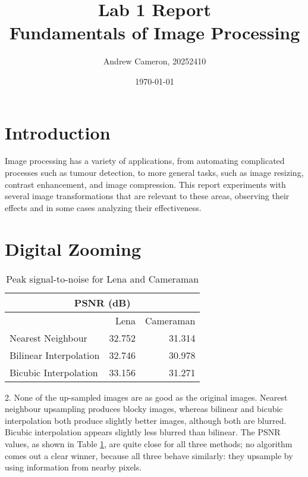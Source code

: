 \documentclass{sydeStyle}
\title{Lab 1 Report\\
Fundamentals of Image Processing}
\date{\today}
\author{Andrew Cameron, 20252410}
\begin{document}
\maketitle

\section*{Introduction}
Image processing has a variety of applications, from automating complicated
processes such as tumour detection, to more general tasks, such as image
resizing, contrast enhancement, and image compression.
This report experiments with several image transformations that are relevant to
these areas, observing their effects and in some cases analyzing their
effectiveness.

\section*{Digital Zooming}

\begin{table}
	\centering
	\begin{tabular}{| l | r | r |}
		\hline
		\multicolumn{3}{|c|}{PSNR (dB)} \\ \hline
		& Lena & Cameraman \\ \hline
		Nearest Neighbour & 32.752 & 31.314 \\ \hline
		Bilinear Interpolation & 32.746 & 30.978 \\ \hline
		Bicubic Interpolation & 33.156 & 31.271 \\
		\hline
	\end{tabular}
	\caption{Peak signal-to-noise for Lena and Cameraman}
	\label{tab:psnr}
\end{table}
2. None of the up-sampled images are as good as the original images.  Nearest
neighbour upsampling produces blocky images, whereas bilinear and
bicubic interpolation both produce slightly better images, although both are
blurred.  Bicubic interpolation appears slightly less blurred than bilinear.
The PSNR values, as shown in Table \ref{tab:psnr}, are quite close for all
three methods; no algorithm comes out a clear winner, because all three
behave similarly: they upsample by using information from nearby pixels.
\end{document}
